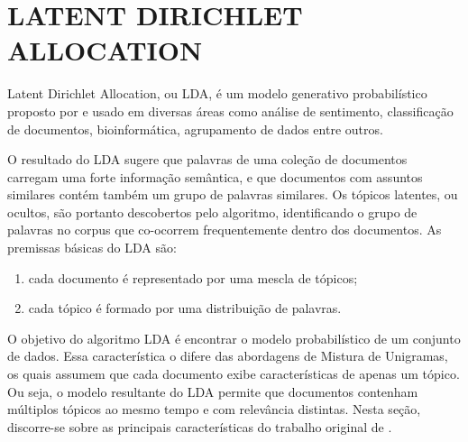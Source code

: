 \documentclass[12pt,a4paper]{article}
\begin{document}



\section{LATENT DIRICHLET ALLOCATION}
Latent Dirichlet Allocation, ou LDA, é um modelo generativo probabilístico proposto por  e usado em diversas áreas como análise de sentimento,
 classificação de documentos, bioinformática, agrupamento de dados entre outros. 
 
 O resultado do LDA sugere que palavras de uma coleção de documentos carregam uma forte informação semântica,
 e que documentos com assuntos similares contém também um grupo de palavras similares. Os tópicos latentes, ou ocultos,
 são portanto descobertos pelo algoritmo, identificando o grupo de palavras no corpus que co-ocorrem frequentemente dentro dos documentos. As premissas  básicas do LDA são:

\begin{enumerate}
  \item cada documento é representado por uma mescla de tópicos;
  \item cada tópico é formado por uma distribuição de palavras.
\end{enumerate}

O objetivo do algoritmo LDA é encontrar o modelo probabilístico de um conjunto de dados. Essa característica o difere das abordagens de Mistura de Unigramas, os quais assumem que cada documento exibe características de apenas um tópico. Ou seja, o modelo resultante do LDA  permite que documentos contenham múltiplos tópicos ao mesmo tempo e com relevância distintas. Nesta seção, discorre-se sobre as principais características do trabalho original de .
 
\end{document}
